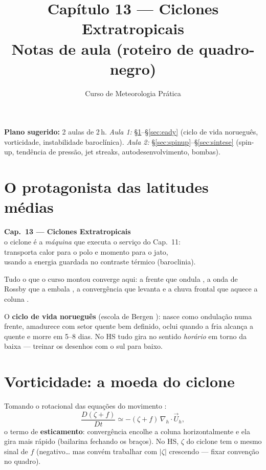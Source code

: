 \documentclass[11pt]{article}
\title{Capítulo 13 --- Ciclones Extratropicais\\
{\large Notas de aula (roteiro de quadro-negro)}}
\author{Curso de Meteorologia Prática}
\date{}
\begin{document}
\maketitle
\thispagestyle{fancy}

\noindent\textbf{Plano sugerido:} 2 aulas de 2\,h.
\emph{Aula 1:} \S\ref{sec:vida}--\S\ref{sec:eady} (ciclo de vida
norueguês, vorticidade, instabilidade baroclínica).
\emph{Aula 2:} \S\ref{sec:spinup}--\S\ref{sec:sintese} (spin-up,
tendência de pressão, jet streaks, autodesenvolvimento, bombas).

\section{O protagonista das latitudes médias}\label{sec:vida}

\begin{noquadro}[abertura]
\textbf{Cap.~13 --- Ciclones Extratropicais}\\[2pt]
o ciclone é a \emph{máquina} que executa o serviço do Cap.~11:\\
transporta calor para o polo e momento para o jato,\\
usando a energia guardada no contraste térmico (baroclinia).
\end{noquadro}

Tudo o que o curso montou converge aqui: a frente que ondula
, a onda de Rossby que a embala
, a convergência que levanta
 e a chuva frontal que aquece a coluna
.


O \textbf{ciclo de vida norueguês} (escola de Bergen
): nasce como ondulação numa frente, amadurece com
setor quente bem definido, oclui quando a fria alcança a quente
 e morre em 5--8 dias. No HS tudo gira no sentido
\emph{horário} em torno da baixa — treinar os desenhos com o sul para
baixo.

\section{Vorticidade: a moeda do ciclone}\label{sec:vort}

\begin{formadif}
Tomando o rotacional das equações do movimento
:
\[ \frac{D(\zeta + f)}{Dt} \simeq -(\zeta + f)\,
\nabla_h\!\cdot\vec U_h, \]
o termo de \textbf{esticamento}: convergência encolhe a coluna
horizontalmente e ela gira mais rápido (bailarina fechando os braços).
No HS, $\zeta$ do ciclone tem o mesmo sinal de $f$ (negativo… mas
convém trabalhar com $|\zeta|$ crescendo — fixar convenção no quadro).
\end{formadif}
\end{document}
